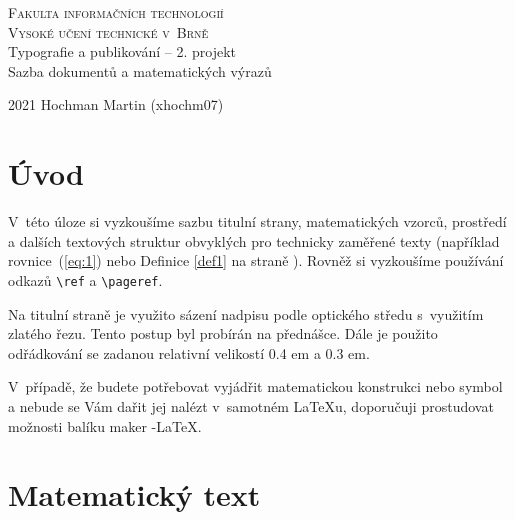 \documentclass[11pt,a4paper,twocolumn]{article}
\begin{document}
\begin{titlepage}
\begin{center}
\thispagestyle{empty}
    \Huge
    \textsc{Fakulta informačních technologií\\
    Vysoké učení technické v~Brně}\\
    \LARGE
    Typografie a publikování -- 2. projekt \\
    Sazba dokumentů a matematických výrazů \\
\end{center}
{\Large 2021 \hfill Hochman Martin (xhochm07)}
\end{titlepage}
\setcounter{page}{1}
\section*{Úvod}
V~této úloze si vyzkoušíme sazbu titulní strany, matematických vzorců, prostředí a dalších textových struktur obvyklých pro technicky zaměřené texty (například rovnice~(\ref{eq:1}) nebo Definice \ref{def1} na straně  \pageref{eq:1}). Rovněž si vyzkoušíme používání odkazů \verb|\ref| a \verb|\pageref|.

Na titulní straně je využito sázení nadpisu podle optického středu s~využitím zlatého řezu. Tento postup byl probírán na přednášce. Dále je použito odřádkování se zadanou relativní velikostí 0.4 em a 0.3 em.

V~případě, že budete potřebovat vyjádřit matematickou konstrukci nebo symbol a nebude se Vám dařit jej nalézt v~samotném \LaTeX u, doporučuji prostudovat možnosti balíku maker \AmS -\LaTeX.

\section{Matematický text}
\end{document}
